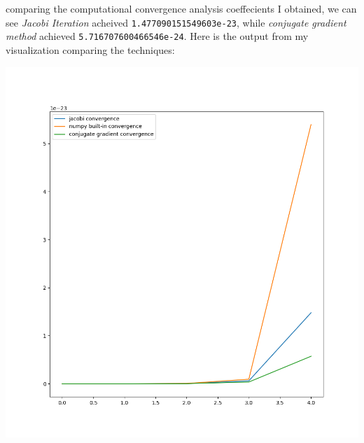 \documentclass[10pt]{article}
\newcommand{\1}{\mathbb{1}}
\begin{document}
comparing the computational convergence analysis coeffecients I obtained, we can see \textit{Jacobi Iteration} acheived \verb|1.477090151549603e-23|, while \textit{conjugate gradient method} achieved \verb|5.716707600466546e-24|. Here is the output from my visualization comparing the techniques:

\begin{center}
    \includegraphics[scale=0.25]{Figure_1.png}
\end{center}
\noindent \underline{\hspace{3in}}\\
\end{document}

